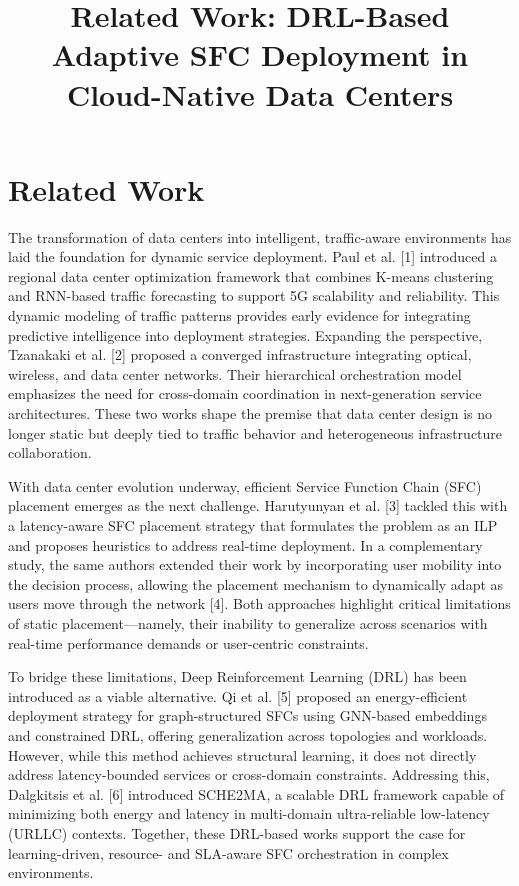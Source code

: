 \documentclass[conference]{IEEEtran}
\begin{document}
\title{Related Work: DRL-Based Adaptive SFC Deployment in Cloud-Native Data Centers}

\author{
}

\maketitle

\section{Related Work}

The transformation of data centers into intelligent, traffic-aware environments has laid the foundation for dynamic service deployment. Paul et al. [1] introduced a regional data center optimization framework that combines K-means clustering and RNN-based traffic forecasting to support 5G scalability and reliability. This dynamic modeling of traffic patterns provides early evidence for integrating predictive intelligence into deployment strategies. Expanding the perspective, Tzanakaki et al. [2] proposed a converged infrastructure integrating optical, wireless, and data center networks. Their hierarchical orchestration model emphasizes the need for cross-domain coordination in next-generation service architectures. These two works shape the premise that data center design is no longer static but deeply tied to traffic behavior and heterogeneous infrastructure collaboration.

With data center evolution underway, efficient Service Function Chain (SFC) placement emerges as the next challenge. Harutyunyan et al. [3] tackled this with a latency-aware SFC placement strategy that formulates the problem as an ILP and proposes heuristics to address real-time deployment. In a complementary study, the same authors extended their work by incorporating user mobility into the decision process, allowing the placement mechanism to dynamically adapt as users move through the network [4]. Both approaches highlight critical limitations of static placement—namely, their inability to generalize across scenarios with real-time performance demands or user-centric constraints.

To bridge these limitations, Deep Reinforcement Learning (DRL) has been introduced as a viable alternative. Qi et al. [5] proposed an energy-efficient deployment strategy for graph-structured SFCs using GNN-based embeddings and constrained DRL, offering generalization across topologies and workloads. However, while this method achieves structural learning, it does not directly address latency-bounded services or cross-domain constraints. Addressing this, Dalgkitsis et al. [6] introduced SCHE2MA, a scalable DRL framework capable of minimizing both energy and latency in multi-domain ultra-reliable low-latency (URLLC) contexts. Together, these DRL-based works support the case for learning-driven, resource- and SLA-aware SFC orchestration in complex environments.
\end{document}
